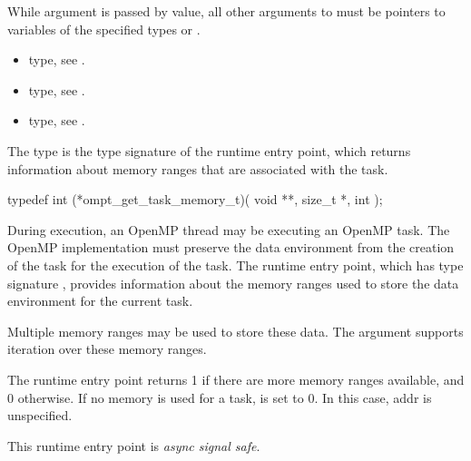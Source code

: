 \constraints
While argument  is passed by value, all other arguments to 
 must be pointers to variables of the specified types 
or .

\crossreferences
\begin{itemize}
\item {} type, see .

\item {} type, see .

\item {} type, see .
\end{itemize}



\label{sec:ompt_get_task_memory_t}
\label{sec:ompt_get_task_memory}

\summary
The  type is the type signature of the 
 runtime entry point, which returns information 
about memory ranges that are associated with the task.

\format
\begin{ccppspecific}
\begin{omptInquiry}
typedef int (*ompt_get_task_memory_t)(
  void **,
  size_t *,
  int 
);
\end{omptInquiry}
\end{ccppspecific}

\descr
During execution, an OpenMP thread may be executing an OpenMP task. The 
OpenMP implementation must preserve the data environment from the creation 
of the task for the execution of the task. The  
runtime entry point, which has type signature ,
provides information about the  memory ranges used to store the data 
environment for the current task.

Multiple memory ranges may be used to store these data. The  
argument supports iteration over these memory ranges.

The  runtime entry point returns 1 if there 
are more memory ranges available, and 0 otherwise. If no memory is used 
for a task,  is set to 0. In this case, addr is unspecified.

This runtime entry point is \emph{async signal safe}.

